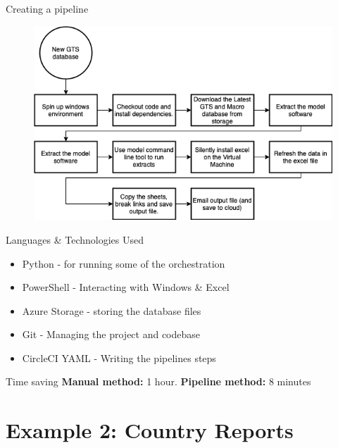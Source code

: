 \documentclass[aspectratio=169]{beamer}
\begin{document}
\begin{frame}{Creating a pipeline}

\begin{figure}
\centering
	\includegraphics[width=0.7\linewidth]{graphics/WhitbreadPipeline.png}
\end{figure}	


\end{frame}



\begin{frame}{Languages \& Technologies Used}

\begin{itemize}
	\item Python - for running some of the orchestration
	\item PowerShell - Interacting with Windows \& Excel
	\item Azure Storage - storing the database files
	\item Git - Managing the project and codebase
	\item CircleCI YAML - Writing the pipelines steps
\end{itemize}	

\begin{block}{Time saving}
	\textbf{Manual method:} 1 hour. \newline
	\textbf{Pipeline method:} 8 minutes
\end{block}


\end{frame}


\section{Example 2: Country Reports}
\end{document}
